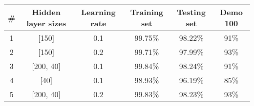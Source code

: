 \begin{center}
  \begin{tabular}{ | c | c | c | c | c | c | }
    \hline
    \# & Hidden layer sizes & Learning rate & Training set & Testing set & Demo 100 \\ \hline
    1 & [150] & 0.1 & 99.75\% & 98.22\% & 91\% \\ \hline
    2 & [150] & 0.2 & 99.71\% & 97.99\% & 93\% \\ \hline
    3 & [200, 40] & 0.1 & 99.84\% & 98.24\% & 91\% \\ \hline
    4 & [40] & 0.1 & 98.93\% & 96.19\% & 85\% \\ \hline
    5 & [200, 40] & 0.2 & 99.83\% & 98.23\% & 93\% \\
    \hline
  \end{tabular}
\end{center}

